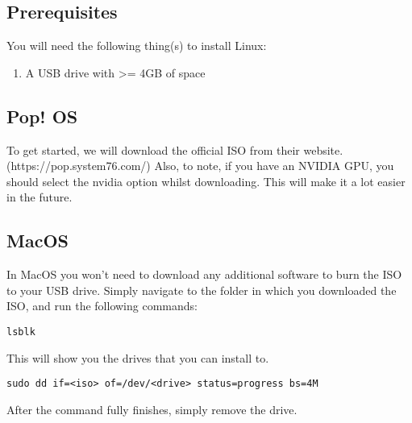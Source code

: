 \documentclass {report}
\begin{document}
\subsection{Prerequisites}
You will need the following thing(s) to install Linux:
\begin{enumerate}
  \item A USB drive with >= 4GB of space
\end{enumerate}

\subsection{Pop! OS}
To get started, we will download the official ISO from their website. (https://pop.system76.com/) Also, to note, if you have an NVIDIA GPU, you should select the nvidia option whilst downloading. This will make it a lot easier in the future.

\subsection{MacOS}
In MacOS you won't need to download any additional software to burn the ISO to your USB drive. Simply navigate to the folder in which you downloaded the ISO, and run the following commands:

\begin{lstlisting}
lsblk
\end{lstlisting}

This will show you the drives that you can install to.

\begin{lstlisting}
sudo dd if=<iso> of=/dev/<drive> status=progress bs=4M
\end{lstlisting}

After the command fully finishes, simply remove the drive.
\end{document}
